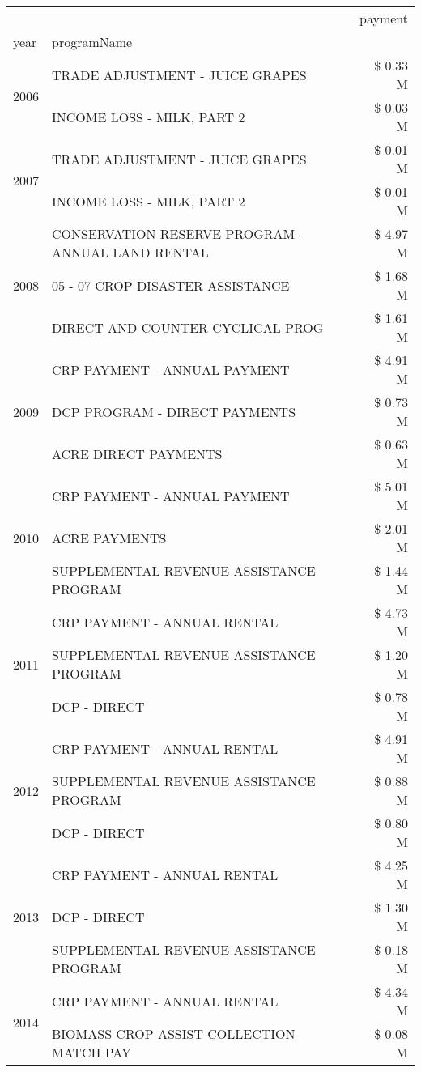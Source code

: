 \begin{tabular}{llr}
\toprule
 &  & payment \\
year & programName &  \\
\midrule
\multirow[t]{2}{*}{2006} & TRADE ADJUSTMENT - JUICE GRAPES & \$ 0.33 M \\
 & INCOME LOSS - MILK, PART 2 & \$ 0.03 M \\
\cline{1-3}
\multirow[t]{2}{*}{2007} & TRADE ADJUSTMENT - JUICE GRAPES & \$ 0.01 M \\
 & INCOME LOSS - MILK, PART 2 & \$ 0.01 M \\
\cline{1-3}
\multirow[t]{3}{*}{2008} & CONSERVATION RESERVE PROGRAM - ANNUAL LAND RENTAL & \$ 4.97 M \\
 & 05 - 07 CROP DISASTER ASSISTANCE & \$ 1.68 M \\
 & DIRECT AND COUNTER CYCLICAL PROG & \$ 1.61 M \\
\cline{1-3}
\multirow[t]{3}{*}{2009} & CRP PAYMENT - ANNUAL PAYMENT & \$ 4.91 M \\
 & DCP PROGRAM - DIRECT PAYMENTS & \$ 0.73 M \\
 & ACRE DIRECT PAYMENTS & \$ 0.63 M \\
\cline{1-3}
\multirow[t]{3}{*}{2010} & CRP PAYMENT - ANNUAL PAYMENT & \$ 5.01 M \\
 & ACRE PAYMENTS & \$ 2.01 M \\
 & SUPPLEMENTAL REVENUE ASSISTANCE PROGRAM & \$ 1.44 M \\
\cline{1-3}
\multirow[t]{3}{*}{2011} & CRP PAYMENT - ANNUAL RENTAL & \$ 4.73 M \\
 & SUPPLEMENTAL REVENUE ASSISTANCE PROGRAM & \$ 1.20 M \\
 & DCP - DIRECT & \$ 0.78 M \\
\cline{1-3}
\multirow[t]{3}{*}{2012} & CRP PAYMENT - ANNUAL RENTAL & \$ 4.91 M \\
 & SUPPLEMENTAL REVENUE ASSISTANCE PROGRAM & \$ 0.88 M \\
 & DCP - DIRECT & \$ 0.80 M \\
\cline{1-3}
\multirow[t]{3}{*}{2013} & CRP PAYMENT - ANNUAL RENTAL & \$ 4.25 M \\
 & DCP - DIRECT & \$ 1.30 M \\
 & SUPPLEMENTAL REVENUE ASSISTANCE PROGRAM & \$ 0.18 M \\
\cline{1-3}
\multirow[t]{3}{*}{2014} & CRP PAYMENT - ANNUAL RENTAL & \$ 4.34 M \\
 & BIOMASS CROP ASSIST COLLECTION MATCH PAY & \$ 0.08 M \\

\end{tabular}
